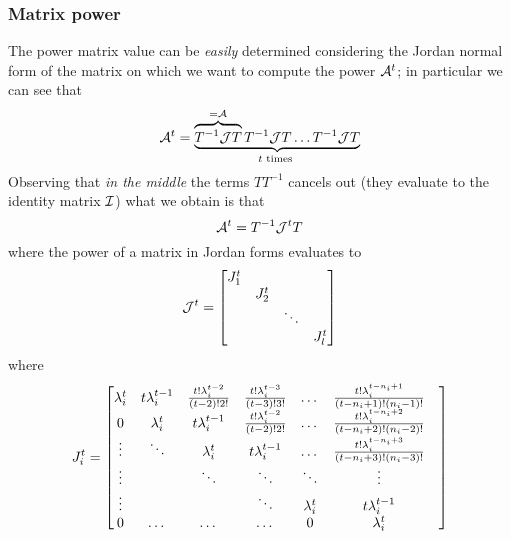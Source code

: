 	\subsubsection{Matrix power}
		The power matrix value can be \textit{easily} determined considering the Jordan normal form of the matrix on which we want to compute the power $\mathcal{A}^t$; in particular we can see that
		\[ \mathcal{A}^ t = \underbrace{ \overbrace{T^{-1} \mathcal{J} T}^{=\mathcal{A}}  T^{-1} \mathcal{J} T \dots T^{-1} \mathcal{J} T }_{t \textrm{ times } }  \]
		Observing that \textit{in the middle} the terms $T T^{-1}$ cancels out (they evaluate to the identity matrix $\mathcal{I}$) what we obtain is that
		\begin{equation}
			\mathcal{A}^t = T^{-1} \mathcal{J}^t T
		\end{equation}
		where the power of a matrix in Jordan forms evaluates to
		\begin{equation}
			\mathcal{J}^t = \begin{bmatrix} J_1^t \\ & J_2^t \\ && \ddots \\ &&& J_l^t \end{bmatrix}
		\end{equation} 
		where
		\[ J_i^t = \begin{bmatrix}  
			\lambda_i^t & t \lambda_i^{t-1} & \frac{t! \lambda_i^{t-2 }}{(t-2)! 2!} & \frac{t! \lambda_i^{t-3 }}{(t-3)! 3!} & \dots & \frac{t! \lambda_i^{t-n_i+1}}{(t-n_i+1)!(n_i-1)!} \\
			0&\lambda_i^t & t \lambda_i^{t-1} &  \frac{t! \lambda_i^{t-2 }}{(t-2)! 2!} &  \dots & \frac{t! \lambda_i^{t-n_i+2}}{(t-n_i+2)!(n_i-2)!}\\
			\vdots & \ddots &\lambda_i^t &  t \lambda_i^{t-1} & \dots & \frac{t! \lambda_i^{t-n_i+3}}{(t-n_i+3)!(n_i-3)!} \\
			\vdots && \ddots & \ddots & \ddots & \vdots\\
			\vdots&&& \ddots &\lambda_i^t &  t \lambda_i^{t-1} &\\
			0& \dots& \dots & \dots& 0&\lambda_i^t &  \\			
		  \end{bmatrix} \]
		
